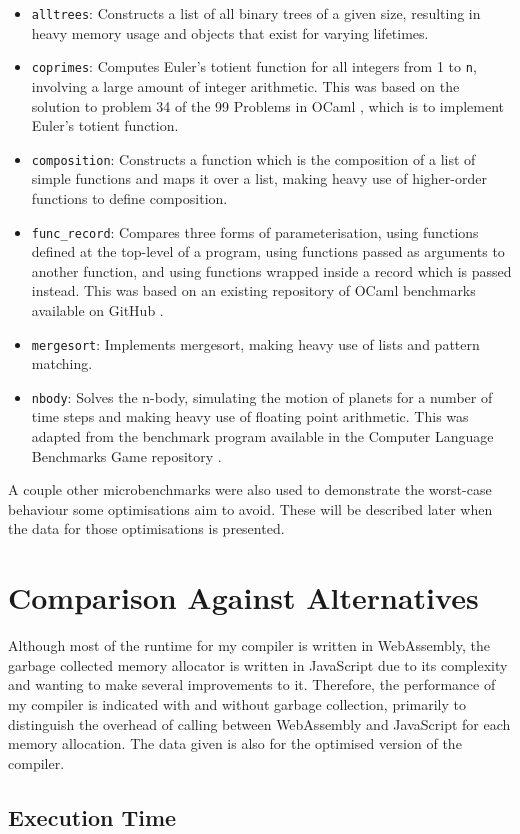\begin{itemize}
\item \verb|alltrees|: Constructs a list of all binary trees of a given size, resulting in heavy memory usage and objects that exist for varying lifetimes.

\item \verb|coprimes|: Computes Euler's totient function for all integers from 1 to \verb|n|, involving a large amount of integer arithmetic. This was based on the solution to problem 34 of the 99 Problems in OCaml \nocite{99-problems}, which is to implement Euler's totient function.

\item \verb|composition|: Constructs a function which is the composition of a list of simple functions and maps it over a list, making heavy use of higher-order functions to define composition.

\item \verb|func_record|: Compares three forms of parameterisation, using functions defined at the top-level of a program, using functions passed as arguments to another function, and using functions wrapped inside a record which is passed instead. This was based on an existing repository of OCaml benchmarks available on GitHub \nocite{chris00}.

\item \verb|mergesort|: Implements mergesort, making heavy use of lists and pattern matching.

\item \verb|nbody|: Solves the n-body, simulating the motion of planets for a number of time steps and making heavy use of floating point arithmetic. This was adapted from the benchmark program available in the Computer Language Benchmarks Game repository \nocite{benchmark-game}.
\end{itemize}

A couple other microbenchmarks were also used to demonstrate the worst-case behaviour some optimisations aim to avoid. These will be described later when the data for those optimisations is presented. 


\section{Comparison Against Alternatives}
Although most of the runtime for my compiler is written in WebAssembly, the garbage collected memory allocator is written in JavaScript due to its complexity and wanting to make several improvements to it. Therefore, the performance of my compiler is indicated with and without garbage collection, primarily to distinguish the overhead of calling between WebAssembly and JavaScript for each memory allocation. The data given is also for the optimised version of the compiler.

\subsection{Execution Time}







